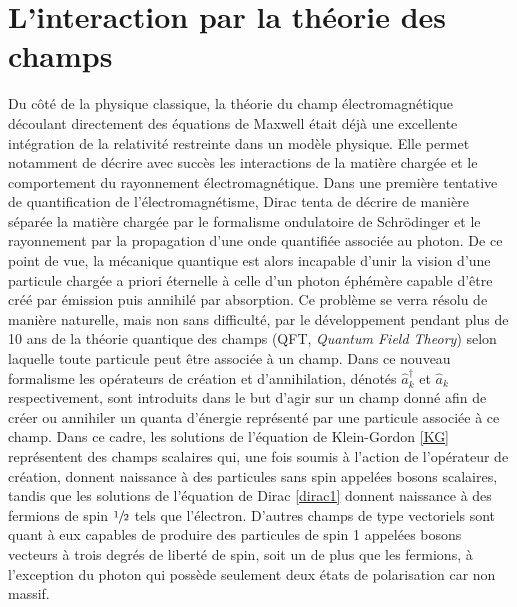         \section{L'interaction par la théorie des champs}
        \label{sectionQFT}
        
        Du côté de la physique classique, la théorie du champ électromagnétique découlant directement des équations de Maxwell était déjà une excellente intégration de la relativité restreinte dans un modèle physique. Elle permet notamment de décrire avec succès les interactions de la matière chargée et le comportement du rayonnement électromagnétique. Dans une première tentative de quantification de l'électromagnétisme, Dirac tenta de décrire de manière séparée la matière chargée par le formalisme ondulatoire de Schrödinger et le rayonnement par la propagation d'une onde quantifiée associée au photon. De ce point de vue, la mécanique quantique est alors incapable d'unir la vision d'une particule chargée a priori éternelle à celle d'un photon éphémère capable d'être créé par émission puis annihilé par absorption. Ce problème se verra résolu de manière naturelle, mais non sans difficulté, par le développement pendant plus de 10 ans de la théorie quantique des champs (QFT, \textit{Quantum Field Theory}) selon laquelle toute particule peut être associée à un champ. Dans ce nouveau formalisme les opérateurs de création et d'annihilation, dénotés $\hat{a}^{\dag}_k$ et $\hat{a}_k$ respectivement, sont introduits dans le but d'agir sur un champ donné afin de créer ou annihiler un quanta d'énergie représenté par une particule associée à ce champ. Dans ce cadre, les solutions de l'équation de Klein-Gordon \ref{KG} représentent des champs scalaires qui, une fois soumis à l'action de l'opérateur de création, donnent naissance à des particules sans spin appelées bosons scalaires, tandis que les solutions de l'équation de Dirac \ref{dirac1} donnent naissance à des fermions de spin $\sfrac{1}{2}$ tels que l'électron. D'autres champs de type vectoriels sont quant à eux capables de produire des particules de spin 1 appelées bosons vecteurs à trois degrés de liberté de spin, soit un de plus que les fermions, à l'exception du photon qui possède seulement deux états de polarisation car non massif. \\
        
